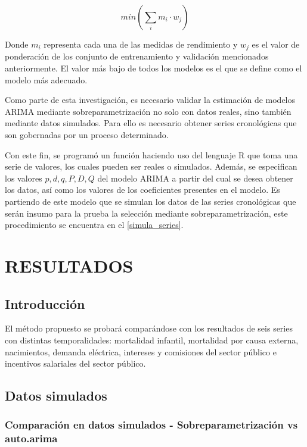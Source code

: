 \documentclass[
]{article}
\begin{document}
\begin{equation}
\label{eqn:concenso}
min\left( \sum_i {m_i}\cdot w_j \right)
\end{equation}

Donde \(m_i\) representa cada una de las medidas de rendimiento y
\(w_j\) es el valor de ponderación de los conjunto de entrenamiento y
validación mencionados anteriormente. El valor más bajo de todos los
modelos es el que se define como el modelo más adecuado.

Como parte de esta investigación, es necesario validar la estimación de
modelos ARIMA mediante sobreparametrización no solo con datos reales,
sino también mediante datos simulados. Para ello es necesario obtener
series cronológicas que son gobernadas por un proceso determinado.

Con este fin, se programó un función haciendo uso del lenguaje R que
toma una serie de valores, los cuales pueden ser reales o simulados.
Además, se especifican los valores \(p,d,q,P,D,Q\) del modelo ARIMA a
partir del cual se desea obtener los datos, así como los valores de los
coeficientes presentes en el modelo. Es partiendo de este modelo que se
simulan los datos de las series cronológicas que serán insumo para la
prueba la selección mediante sobreparametrización, este procedimiento se
encuentra en el \ref{simula_series}.

\newpage

\section{RESULTADOS}

\subsection{Introducción}

El método propuesto se probará comparándose con los resultados de seis
series con distintas temporalidades: mortalidad infantil, mortalidad por
causa externa, nacimientos, demanda eléctrica, intereses y comisiones
del sector público e incentivos salariales del sector público.

\subsection{Datos simulados}

\subsubsection{Comparación en datos simulados - Sobreparametrización vs auto.arima}
\end{document}
